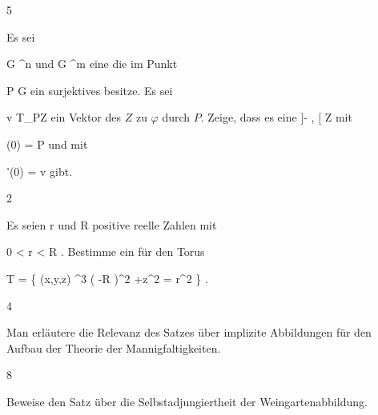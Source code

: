 {5}
{

Es sei

\mavergleichskette
{\vergleichskette
{ G
}
{ \subseteq }{ \R^n
}
{  }{
}
{    }{
}
{   }{
}
}
{}{}{}
und
\maabbdisp {\varphi} { G } { \R^m
} {}
eine
die im Punkt

\mavergleichskette
{\vergleichskette
{ P
}
{ \in }{ G
}
{  }{
}
{    }{
}
{   }{
}
}
{}{}{}
ein surjektives
besitze. Es sei

\mavergleichskette
{\vergleichskette
{ v
}
{ \in }{ T_PZ
}
{  }{
}
{    }{
}
{   }{
}
}
{}{}{}
ein Vektor des
$Z$ zu $\varphi$ durch $P$. Zeige, dass es eine
\maabbdisp {\gamma} { ]- \epsilon, \epsilon[ } { Z
} {}
 {} {}
mit

\mavergleichskette
{\vergleichskette
{ \gamma(0)
}
{ = }{ P
}
{  }{
}
{    }{
}
{   }{
}
}
{}{}{}
und mit

\mavergleichskettedisp
{\vergleichskette
{ \gamma'(0)
}
{ =} { v
}
{ } {
}
{ } {
}
{ } {
}
}
{}{}{}
gibt.

}
{} {}

{2}
{

Es seien
\mathkor {} {r} {und} {R} {}
positive reelle Zahlen mit

\mavergleichskette
{\vergleichskette
{ 0
}
{ < }{ r
}
{ < }{ R
}
{    }{
}
{   }{
}
}
{}{}{.}
Bestimme ein
für den
 {} {}
Torus

\mavergleichskettedisp
{\vergleichskette
{ T
}
{ =} { \left\{ (x,y,z) \in \R^3  \mid   \left(   -R  \right)^2 +z^2  = r^2         \right\}
}
{ } {
}
{ } {
}
{ } {
}
}
{}{}{.}

}
{} {}

{4}
{

Man erläutere die Relevanz des Satzes über implizite Abbildungen für den Aufbau der Theorie der Mannigfaltigkeiten.

}
{} {}

{8}
{

Beweise den Satz über die Selbstadjungiertheit der Weingartenabbildung.

}
{} {}

